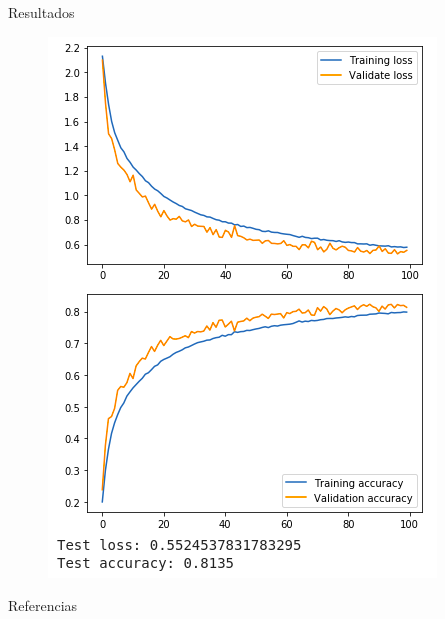 \documentclass[spanish]{beamer}
\begin{document}
\begin{frame}{Resultados}
  \begin{figure}[h]
    \centering
    \includegraphics[width=.5\textwidth]{img/graficascifar}
  \end{figure}
\end{frame}

\begin{frame}[t,allowframebreaks]{Referencias}
  \printbibliography[heading=none]
\end{frame}
\end{document}
